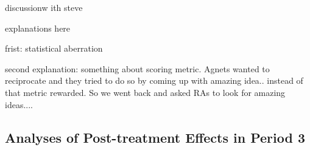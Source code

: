 

discussionw ith steve

explanations here

frist: statistical aberration

second explanation: something about scoring metric. Agnets wanted to reciprocate and they tried to do so by coming up with amazing idea.. instead of that metric rewarded. So we went back and asked RAs to look for amazing ideas.... 

\subsection{Analyses of Post-treatment Effects in Period 3}\label{chap:ex_post}




